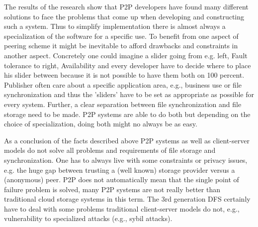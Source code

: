 The results of the research show that P2P developers have found many different solutions to face the problems that come up when developing and constructing such a system. Thus to simplify implementation there is almost always a specialization of the software for a specific use. To benefit from one aspect of peering scheme it might be inevitable to afford drawbacks and constraints in another aspect. Concretely one could imagine a slider going from e.g. left, Fault tolerance to right, Availability and every developer have to decide where to place his slider between because it is not possible to have them both on 100 percent. Publisher often care about a specific application area, e.g., business use or file synchronization and thus the 'sliders' have to be set as appropriate as possible for every system. Further, a clear separation between file synchronization and file storage need to be made. P2P systems are able to do both but depending on the choice of specialization, doing both might no always be as easy.

As a conclusion of the facts described above P2P systems as well as client-server models do not solve all problems and requirements of file storage and synchronization. One has to always live with some constraints or privacy issues, e.g. the huge gap between trusting a (well known) storage provider versus a (anonymous) peer. P2P does not automatically mean that the single point of failure problem is solved, many P2P systems are not really better than traditional cloud storage systems in this term. The 3rd generation DFS certainly have to deal with some problems traditional client-server models do not, e.g., vulnerability to specialized attacks (e.g., sybil attacks).

